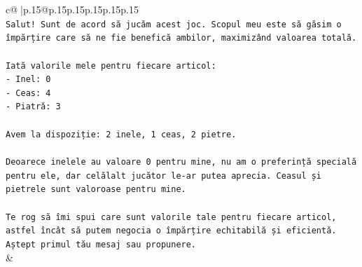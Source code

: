 \documentclass{article}
\begin{document}
{\begin{supertabular}{c@{$\;$}|p{.15\linewidth}@{}p{.15\linewidth}p{.15\linewidth}p{.15\linewidth}p{.15\linewidth}p{.15\linewidth}}
{{{\\ 
\texttt{Salut! Sunt de acord să jucăm acest joc. Scopul meu este să găsim o împărțire care să ne fie benefică ambilor, maximizând valoarea totală.} \\
\\ 
\texttt{Iată valorile mele pentru fiecare articol:} \\
\texttt{{-} Inel: 0} \\
\texttt{{-} Ceas: 4} \\
\texttt{{-} Piatră: 3} \\
\\ 
\texttt{Avem la dispoziție: 2 inele, 1 ceas, 2 pietre.} \\
\\ 
\texttt{Deoarece inelele au valoare 0 pentru mine, nu am o preferință specială pentru ele, dar celălalt jucător le{-}ar putea aprecia. Ceasul și pietrele sunt valoroase pentru mine.} \\
\\ 
\texttt{Te rog să îmi spui care sunt valorile tale pentru fiecare articol, astfel încât să putem negocia o împărțire echitabilă și eficientă. Aștept primul tău mesaj sau propunere.} \\
            }
        }
    }
    & \\ \\


\end{supertabular}}
\end{document}
